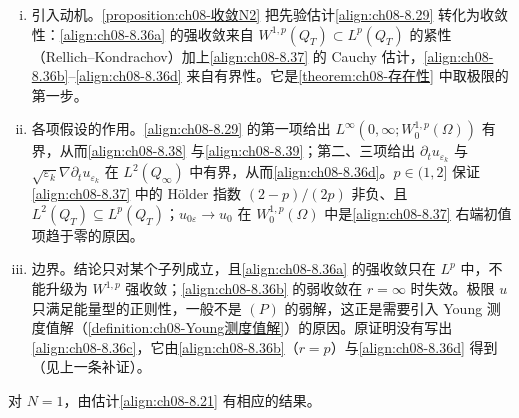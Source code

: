 \documentclass[../../main.tex]{subfiles}%
\begin{document}
\begin{remark}\label{remark:ch08-收敛N2动机}
\begin{enumerate}[(i)]
\item 引入动机。\cref{proposition:ch08-收敛N2} 把先验估计\eqref{align:ch08-8.29} 转化为收敛性：\eqref{align:ch08-8.36a} 的强收敛来自 $W^{1,p}(Q_T)\subset L^p(Q_T)$ 的紧性（Rellich--Kondrachov）加上\eqref{align:ch08-8.37} 的 Cauchy 估计，\eqref{align:ch08-8.36b}--\eqref{align:ch08-8.36d} 来自有界性。它是\cref{theorem:ch08-存在性} 中取极限的第一步。
\item 各项假设的作用。\eqref{align:ch08-8.29} 的第一项给出 $L^\infty(0,\infty;W^{1,p}_0(\Omega))$ 有界，从而\eqref{align:ch08-8.38} 与\eqref{align:ch08-8.39}；第二、三项给出 $\partial_tu_{\varepsilon_k}$ 与 $\sqrt{\varepsilon_k}\nabla\partial_tu_{\varepsilon_k}$ 在 $L^2(Q_\infty)$ 中有界，从而\eqref{align:ch08-8.36d}。$p\in(1,2]$ 保证\eqref{align:ch08-8.37} 中的 Hölder 指数 $(2-p)/(2p)$ 非负、且 $L^2(Q_T)\subseteq L^p(Q_T)$；$u_{0\varepsilon}\to u_0$ 在 $W^{1,p}_0(\Omega)$ 中是\eqref{align:ch08-8.37} 右端初值项趋于零的原因。
\item 边界。结论只对某个子列成立，且\eqref{align:ch08-8.36a} 的强收敛只在 $L^p$ 中，不能升级为 $W^{1,p}$ 强收敛；\eqref{align:ch08-8.36b} 的弱收敛在 $r=\infty$ 时失效。极限 $u$ 只满足能量型的正则性，一般不是 $(P)$ 的弱解，这正是需要引入 Young 测度值解（\cref{definition:ch08-Young测度值解}）的原因。原证明没有写出\eqref{align:ch08-8.36c}，它由\eqref{align:ch08-8.36b}（$r=p$）与\eqref{align:ch08-8.36d} 得到（见上一条补证）。
\end{enumerate}
\end{remark}

对 $N=1$，由估计\eqref{align:ch08-8.21} 有相应的结果。
\end{document}
